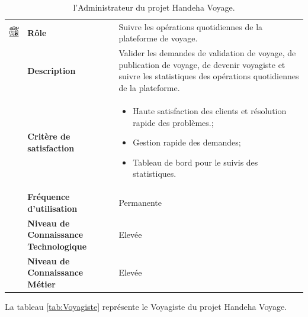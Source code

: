 \documentclass[12pt]{report}
\begin{document}
				\begin{table}[h]
				  \centering
				  \caption{l'Administrateur du projet Handeha Voyage.}
				  \label{tab:aAdmHandeha}
				    \begin{tabular}{|p{3cm}|p{4cm}|p{7cm}|}
					\hline
					\begin{minipage}{3cm}
						\includegraphics[width=2cm]{adminHandeha.png}
					\end{minipage} & \textbf{Rôle} & Suivre les opérations quotidiennes de la plateforme de voyage.\\ \cline{2-3}
							& \textbf{Description} & Valider les demandes de validation de voyage, de publication de voyage, de devenir voyagiste et suivre les statistiques des opérations quotidiennes de la plateforme.  \\ \cline{2-3}
							& \textbf{Critère de satisfaction}& \begin{itemize}
														\item Haute satisfaction des clients et résolution rapide des problèmes.;
														\item Gestion rapide des demandes;
														\item Tableau de bord pour le suivis des statistiques.
													\end{itemize}\\ \cline{2-3}
							&\textbf{Fréquence d’utilisation} & Permanente \\  \cline{2-3}
							&\textbf{Niveau de Connaissance Technologique} & Elevée \\  \cline{2-3}
							&\textbf{Niveau de Connaissance Métier} & Elevée \\ 
					\hline
				    \end{tabular}
				\end{table}
				\FloatBarrier				

				La tableau \ref{tab:Voyagiste} représente le Voyagiste du projet Handeha Voyage.
\end{document}
